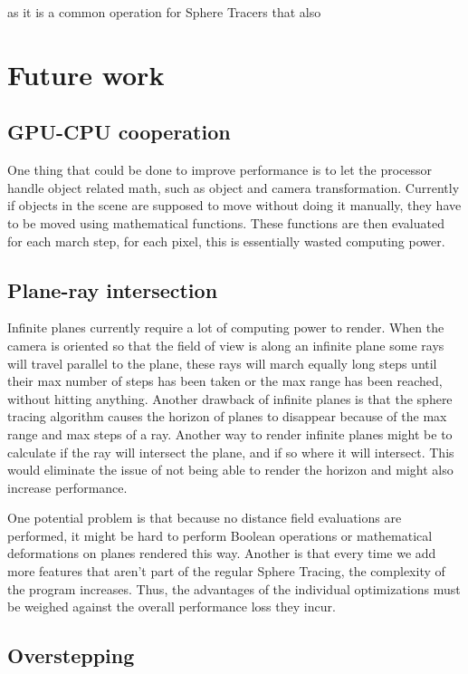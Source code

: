 			as it is a common operation for Sphere Tracers that also
		

	\section{Future work}

		\subsection{GPU-CPU cooperation}
			One thing that could be done to improve performance is to let the
			processor handle object related math, such as object and camera 
			transformation. Currently if objects in the scene are supposed to 
			move without doing it manually, they have to be moved using 
			mathematical functions. These functions are then evaluated for 
			each march step, for each pixel, this is essentially wasted 
			computing power.


		\subsection{Plane-ray intersection}

			Infinite planes currently require a lot of computing power to
			render. When the camera is oriented so that the field of view is
			along an infinite plane some rays will travel parallel to the
			plane, these rays will march equally long steps until their max
			number of steps has been taken or the max range has been reached,
			without hitting anything. Another drawback of infinite planes is
			that the sphere tracing algorithm causes the horizon of planes to
			disappear because of the max range and max steps of a ray. Another
			way to render infinite planes might be to calculate if the ray will
			intersect the plane, and if so where it will intersect. This would
			eliminate the issue of not being able to render the horizon and
			might also increase performance.

			One potential problem is that because no distance field evaluations 
			are performed, it might be hard to perform Boolean operations or 
			mathematical deformations on planes rendered this way. Another is 
			that every time we add more features that aren't part of the regular 
			Sphere Tracing, the complexity of the program increases. Thus, the 
			advantages of the individual optimizations must be weighed against 
			the overall performance loss they incur. 

		\subsection{Overstepping}

